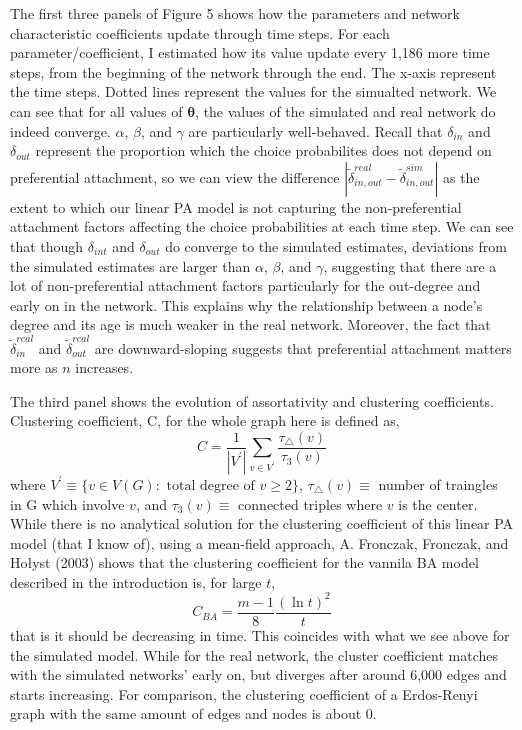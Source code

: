 \documentclass[]{elsarticle} %
\begin{document}
The first three panels of Figure 5 shows how the parameters and network
characteristic coefficients update through time steps. For each
parameter/coefficient, I estimated how its value update every 1,186 more
time steps, from the beginning of the network through the end. The
x-axis represent the time steps. Dotted lines represent the values for
the simualted network. We can see that for all values of
\(\boldsymbol{\theta}\), the values of the simulated and real network do
indeed converge. \(\alpha\), \(\beta\), and \(\gamma\) are particularly
well-behaved. Recall that \(\delta_{in}\) and \(\delta_{out}\) represent
the proportion which the choice probabilites does not depend on
preferential attachment, so we can view the difference
\(|\tilde{\delta}^{real}_{in, out} - \tilde{\delta}^{sim}_{in, out}|\)
as the extent to which our linear PA model is not capturing the
non-preferential attachment factors affecting the choice probabilities
at each time step. We can see that though \(\delta_{int}\) and
\(\delta_{out}\) do converge to the simulated estimates, deviations from
the simulated estimates are larger than \(\alpha\), \(\beta\), and
\(\gamma\), suggesting that there are a lot of non-preferential
attachment factors particularly for the out-degree and early on in the
network. This explains why the relationship between a node's degree and
its age is much weaker in the real network. Moreover, the fact that
\(\tilde{\delta}^{real}_{in}\) and \(\tilde{\delta}^{real}_{out}\) are
downward-sloping suggests that preferential attachment matters more as
\(n\) increases.

The third panel shows the evolution of assortativity and clustering
coefficients. Clustering coefficient, C, for the whole graph here is
defined as, \[
C = \frac{1}{| V^\prime |}\sum_{v \in V^\prime}\frac{\tau_{\triangle}(v)}{\tau_{3}(v)}
\] \noindent where
\(V^\prime \equiv \{ v \in V(G) : \text{ total degree of } v \geq 2 \}\),
\(\tau_{\triangle}(v) \equiv\) number of traingles in G which involve
\(v\), and \(\tau_{3}(v) \equiv\) connected triples where \(v\) is the
center. While there is no analytical solution for the clustering
coefficient of this linear PA model (that I know of), using a mean-field
approach, A. Fronczak, Fronczak, and Hołyst (2003) shows that the
clustering coefficient for the vannila BA model described in the
introduction is, for large \(t\), \[
C_{BA} = \frac{m-1}{8}\frac{(\ln t)^2}{t}
\] that is it should be decreasing in time. This coincides with what we
see above for the simulated model. While for the real network, the
cluster coefficient matches with the simulated networks' early on, but
diverges after around 6,000 edges and starts increasing. For comparison,
the clustering coefficient of a Erdos-Renyi graph with the same amount
of edges and nodes is about 0.
\end{document}
